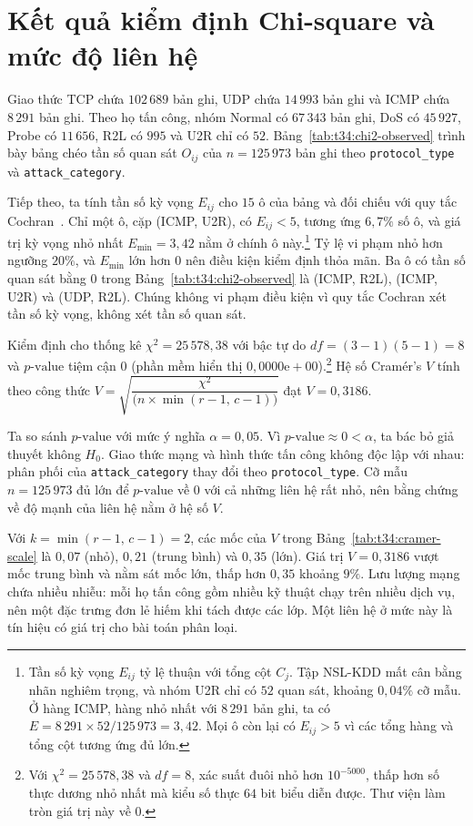 \documentclass[../main.tex]{subfiles}
\begin{document}
\section{Kết quả kiểm định Chi-square và mức độ liên hệ}
Giao thức TCP chứa $102\,689$ bản ghi, UDP chứa $14\,993$ bản ghi và ICMP chứa $8\,291$ bản ghi. Theo họ tấn công, nhóm Normal có $67\,343$ bản ghi, DoS có $45\,927$, Probe có $11\,656$, R2L có $995$ và U2R chỉ có $52$.
Bảng~\ref{tab:t34:chi2-observed} trình bày bảng chéo tần số quan sát $O_{ij}$ của $n = 125\,973$ bản ghi theo \texttt{protocol\_type} và \texttt{attack\_category}.

Tiếp theo, ta tính tần số kỳ vọng $E_{ij}$ cho $15$ ô của bảng và đối chiếu với quy tắc Cochran~\cite{task34_cochran1954}.
Chỉ một ô, cặp (ICMP, U2R), có $E_{ij} < 5$, tương ứng $6{,}7\%$ số ô, và giá trị kỳ vọng nhỏ nhất $E_{\min} = 3{,}42$ nằm ở chính ô này.\footnote{Tần số kỳ vọng $E_{ij}$ tỷ lệ thuận với tổng cột $C_j$. Tập NSL-KDD mất cân bằng nhãn nghiêm trọng, và nhóm U2R chỉ có $52$ quan sát, khoảng $0{,}04\%$ cỡ mẫu. Ở hàng ICMP, hàng nhỏ nhất với $8\,291$ bản ghi, ta có $E = 8\,291 \times 52 / 125\,973 = 3{,}42$. Mọi ô còn lại có $E_{ij} > 5$ vì các tổng hàng và tổng cột tương ứng đủ lớn.} Tỷ lệ vi phạm nhỏ hơn ngưỡng $20\%$, và $E_{\min}$ lớn hơn $0$ nên điều kiện kiểm định thỏa mãn. Ba ô có tần số quan sát bằng $0$ trong Bảng~\ref{tab:t34:chi2-observed} là (ICMP, R2L), (ICMP, U2R) và (UDP, R2L). Chúng không vi phạm điều kiện vì quy tắc Cochran xét tần số kỳ vọng, không xét tần số quan sát.

Kiểm định cho thống kê $\chi^2 = 25\,578{,}38$ với bậc tự do $df = (3 - 1)(5 - 1) = 8$ và $p\text{-value}$ tiệm cận $0$ (phần mềm hiển thị $0{,}0000\text{e}+00$).\footnote{Với $\chi^2 = 25\,578{,}38$ và $df = 8$, xác suất đuôi nhỏ hơn $10^{-5000}$, thấp hơn số thực dương nhỏ nhất mà kiểu số thực $64$ bit biểu diễn được. Thư viện làm tròn giá trị này về $0$.} Hệ số Cramér's $V$ tính theo công thức $V = \sqrt{\dfrac{\chi^2 }{\bigl(n \times \min(r - 1,\, c - 1)\bigr)}}$ đạt $V = 0{,}3186$.

Ta so sánh $p\text{-value}$ với mức ý nghĩa $\alpha = 0{,}05$. Vì $p\text{-value} \approx 0 < \alpha$, ta bác bỏ giả thuyết không $H_0$. Giao thức mạng và hình thức tấn công không độc lập với nhau: phân phối của \texttt{attack\_category} thay đổi theo \texttt{protocol\_type}. Cỡ mẫu $n = 125\,973$ đủ lớn để $p\text{-value}$ về $0$ với cả những liên hệ rất nhỏ, nên bằng chứng về độ mạnh của liên hệ nằm ở hệ số $V$.

Với $k = \min(r - 1,\, c - 1) = 2$, các mốc của $V$ trong Bảng~\ref{tab:t34:cramer-scale} là $0{,}07$ (nhỏ), $0{,}21$ (trung bình) và $0{,}35$ (lớn). Giá trị $V = 0{,}3186$ vượt mốc trung bình và nằm sát mốc lớn, thấp hơn $0{,}35$ khoảng $9\%$. Lưu lượng mạng chứa nhiều nhiễu: mỗi họ tấn công gồm nhiều kỹ thuật chạy trên nhiều dịch vụ, nên một đặc trưng đơn lẻ hiếm khi tách được các lớp. Một liên hệ ở mức này là tín hiệu có giá trị cho bài toán phân loại.
\end{document}
